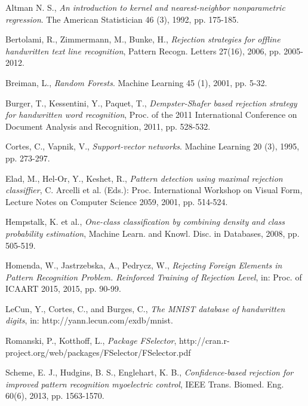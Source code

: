 \documentclass{llncs}
\begin{document}
\begin{thebibliography}{19}
\vspace{-3pt}

Altman N. S., \emph{An introduction to kernel and nearest-neighbor nonparametric regression}. The American Statistician 46 (3), 1992, pp. 175-185.

Bertolami, R., Zimmermann, M., Bunke, H., \emph{Rejection strategies for offline handwritten text line recognition}, Pattern Recogn. Letters 27(16), 2006, pp. 2005-2012.

Breiman, L., \emph{Random Forests}. Machine Learning 45 (1), 2001, pp. 5-32. 

Burger, T., Kessentini, Y., Paquet, T., \emph{Dempster-Shafer based rejection strategy for handwritten word recognition}, Proc. of the 2011 International Conference on Document Analysis and Recognition, 2011, pp. 528-532.

Cortes, C., Vapnik, V., \emph{Support-vector networks}. Machine Learning 20 (3), 1995, pp. 273-297.
 
Elad, M., Hel-Or, Y., Keshet, R., \emph{Pattern detection using maximal rejection classiffier}, C. Arcelli et al. (Eds.): Proc. International Workshop on Visual Form, Lecture Notes on Computer Science 2059, 2001, pp. 514-524.
 
Hempstalk, K. et al., \emph{One-class classification by combining density and class probability estimation}, Machine Learn. and Knowl. Disc. in Databases, 2008, pp. 505-519.

Homenda, W., Jastrzebska, A., Pedrycz, W., \emph{Rejecting Foreign Elements in Pattern Recognition Problem. Reinforced Training of Rejection Level}, in: Proc. of ICAART 2015, 2015, pp. 90-99.


LeCun, Y., Cortes, C., and Burges, C., \emph{The MNIST database of handwritten digits}, in: http://yann.lecun.com/exdb/mnist.

Romanski, P., Kotthoff, L., \emph{Package FSelector}, http://cran.r-project.org/web/packages/FSelector/FSelector.pdf

Scheme, E. J., Hudgins, B. S., Englehart, K. B., \emph{Confidence-based rejection for improved pattern recognition myoelectric control}, IEEE Trans. Biomed. Eng. 60(6), 2013, pp. 1563-1570.


\end{thebibliography}
\end{document}
